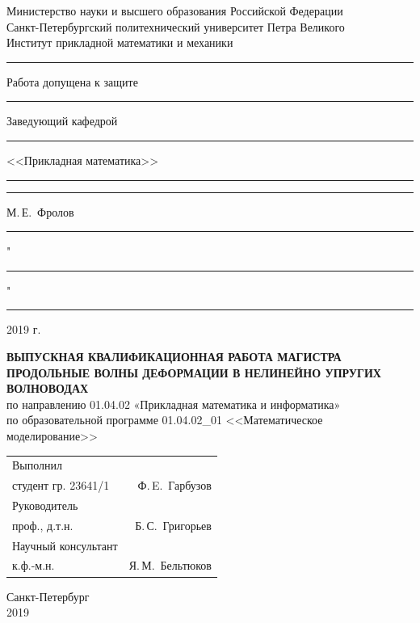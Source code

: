 \documentclass[12pt, a4paper]{report}
\begin{document}
\begin{titlepage}
	\begin{center}
		Министерство науки и высшего образования Российской Федерации\\
		Санкт-Петербургский политехнический университет Петра Великого\\
		Институт прикладной математики и механики
	\end{center}
	
	\vspace{5mm}
	
	\begin{flushleft}
		\rule{10cm}{0pt} {Работа допущена к защите}\\
		\rule{10cm}{0pt} Заведующий кафедрой\\
		\rule{10cm}{0pt} <<Прикладная математика>>\\
		\vspace{4mm}
		\rule{10cm}{0pt} \rule{3.6cm}{0.5pt} М.\,Е.~Фролов\\
		\vspace{2mm}
		\rule{10cm}{0pt} "\rule{0.8cm}{0.5pt}" \rule{3.7cm}{0.5pt} 2019 г.
	\end{flushleft}
	
	\vspace{22mm}
	
	\begin{center}
		{\bf ВЫПУСКНАЯ КВАЛИФИКАЦИОННАЯ РАБОТА МАГИСТРА}\\
		\vspace{5mm} 
		{\bf ПРОДОЛЬНЫЕ ВОЛНЫ ДЕФОРМАЦИИ В НЕЛИНЕЙНО УПРУГИХ ВОЛНОВОДАХ}\\
		\vspace{5mm}
		по направлению 01.04.02 «Прикладная математика и информатика»\\
		по образовательной программе 01.04.02\_01 <<Математическое моделирование>>
	\end{center}

	\vspace{20mm}
	\begin{flushleft}
	\begin{tabularx}{\linewidth}{Xr}
		Выполнил & \\
		студент гр. 23641/1 & Ф.\,E.~Гарбузов\\ 
		\vspace{3mm}
		Руководитель & \\ 
		проф., д.т.н. & Б.\,С.~Григорьев\\ 
		\vspace{3mm}
		Научный консультант  & \\ 
		к.ф.-м.н. & Я.\,М.~Бельтюков
	\end{tabularx} 
	\end{flushleft}
	
	\vspace{30mm}
	
	\begin{center}
		Санкт-Петербург\\2019
	\end{center}
	
\end{titlepage}
\end{document}
